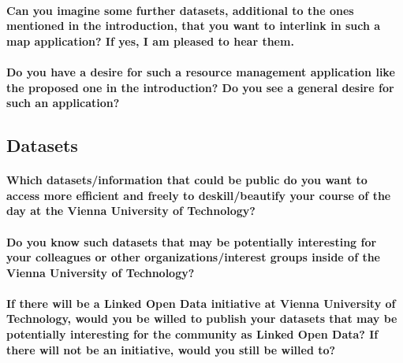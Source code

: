 \documentclass{article}
\begin{document}
\paragraph{Can you imagine some further datasets, additional to the ones mentioned in the introduction, that you want to interlink in such a map application? If yes, I am pleased to hear them.}

\opentwo

\paragraph{Do you have a desire for such a resource management application like the proposed one in the introduction? Do you see a general desire for such an application?}

\opentwo

\subsection{Datasets}
\label{questionaire:datasets}

\paragraph{Which datasets/information that could be public do you want to access more efficient and freely to deskill/beautify your course of the day at the Vienna University of Technology?}

\opentwo

\paragraph{Do you know such datasets that may be potentially interesting for your colleagues or other organizations/interest groups inside of the Vienna University of Technology?}

\opentwo

\paragraph{If there will be a Linked Open Data initiative at Vienna University of Technology, would you be willed to publish your datasets that may be potentially interesting for the community as Linked Open Data? If there will not be an initiative, would you still be willed to?}

\opentwo

\end{document}
